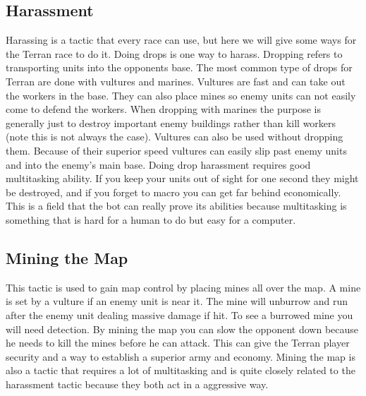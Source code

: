 	\subsection{Harassment}
		Harassing is a tactic that every race can use, but here we will give some ways for the Terran race to do it. 
		Doing drops is one way to harass. Dropping refers to transporting units into the opponents base. 
		The most common type of drops for Terran are done with vultures and marines. Vultures are fast and can take out the workers in the base. 
		They can also place mines so enemy units can not easily come to defend the workers. When dropping with marines 
		the purpose is generally just to destroy important enemy buildings rather than kill workers (note this is not always the case). 
		Vultures can also be used without dropping them. 
		Because of their superior speed vultures can easily slip past enemy units and into the enemy's main base. Doing drop harassment requires 
		good multitasking ability. If you keep your units out of sight for one second they might be destroyed, 
		and if you forget to macro you can get far behind economically. 
		This is a field that the bot can really prove its abilities because 
		multitasking is something that is hard for a human to do but easy for a computer.
	
	\subsection{Mining the Map}
		This tactic is used to gain map control by placing mines all over the map. A mine is set by a vulture 
		if an enemy unit is near it. The mine will unburrow and run after the enemy unit dealing massive damage if hit. To see a burrowed mine you will need 
		detection. By mining the map you can slow the opponent down because he needs to kill the mines before he can attack. 
		This can give the Terran player security and a way to establish a superior army and economy. 
		Mining the map is also a tactic that requires a lot of multitasking and is quite closely related to the harassment tactic because they both act in a 
		aggressive way.